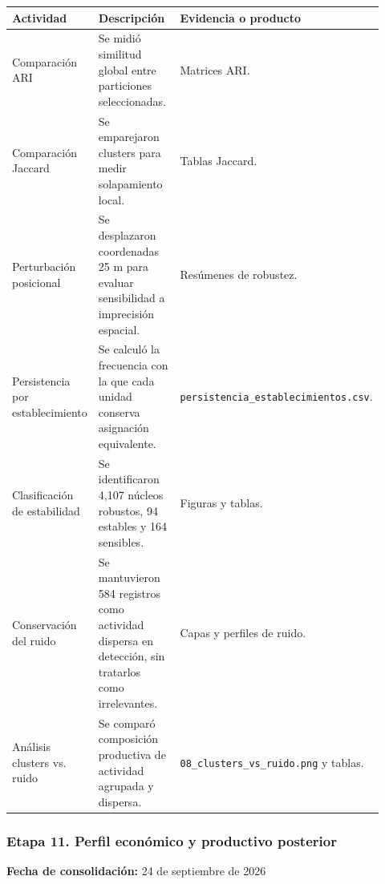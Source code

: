 \documentclass[
  spanish,
]{article}
\newcounter{none} %
\begin{document}
{\def\LTcaptype{none} %
\begin{longtable}[]{@{}p{0.20\linewidth}p{0.44\linewidth}p{0.28\linewidth}@{}}
\toprule\noalign{}
Actividad & Descripción & Evidencia o producto \\
\midrule\noalign{}
\endhead
\bottomrule\noalign{}
\endlastfoot
Comparación ARI & Se midió similitud global entre particiones
seleccionadas. & Matrices ARI. \\
Comparación Jaccard & Se emparejaron clusters para medir solapamiento
local. & Tablas Jaccard. \\
Perturbación posicional & Se desplazaron coordenadas 25 m para evaluar
sensibilidad a imprecisión espacial. & Resúmenes de robustez. \\
Persistencia por establecimiento & Se calculó la frecuencia con la que
cada unidad conserva asignación equivalente. &
\texttt{persistencia\_establecimientos.csv}. \\
Clasificación de estabilidad & Se identificaron 4,107 núcleos robustos,
94 estables y 164 sensibles. & Figuras y tablas. \\
Conservación del ruido & Se mantuvieron 584 registros como actividad
dispersa en detección, sin tratarlos como irrelevantes. & Capas y
perfiles de ruido. \\
Análisis clusters vs. ruido & Se comparó composición productiva de
actividad agrupada y dispersa. & \texttt{08\_clusters\_vs\_ruido.png} y
tablas. \\
\end{longtable}
}

\subsubsection{Etapa 11. Perfil económico y productivo
posterior}\label{etapa-11-perfil-econuxf3mico-y-productivo-posterior}

\textbf{Fecha de consolidación:} 24 de septiembre de 2026
\end{document}
